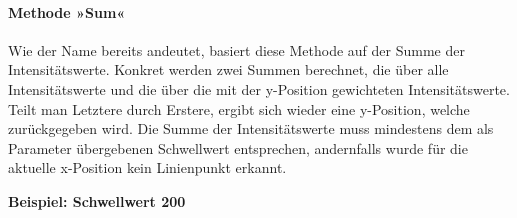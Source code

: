 \documentclass[a4paper,10pt]{scrartcl}
\begin{document}
\paragraph{Methode »Sum«}

Wie der Name bereits andeutet, basiert diese Methode auf der Summe der Intensitätswerte. Konkret werden zwei Summen berechnet, die über alle Intensitätswerte und die über die mit der y-Position gewichteten Intensitätswerte. Teilt man Letztere durch Erstere, ergibt sich wieder eine y-Position, welche zurückgegeben wird. Die Summe der Intensitätswerte muss mindestens dem als Parameter übergebenen Schwellwert entsprechen, andernfalls wurde für die aktuelle x-Position kein Linienpunkt erkannt.

\bigskip
\begin{minipage}{\textwidth} 
\textbf{Beispiel: Schwellwert 200}


\end{minipage}
\end{document}
